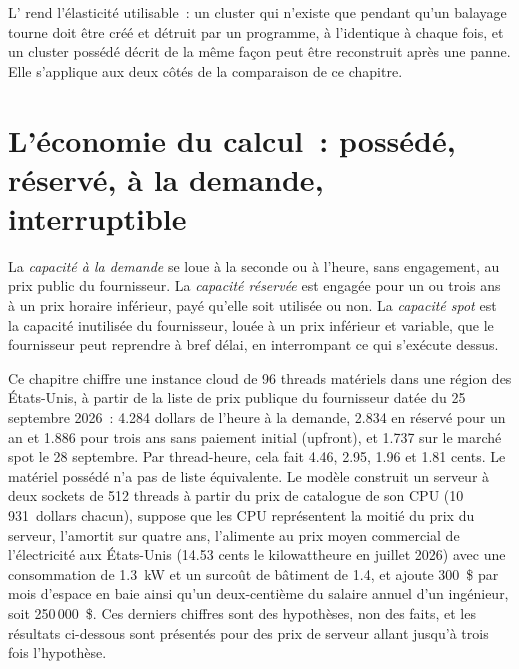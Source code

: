 L' rend l'élasticité utilisable~: un cluster qui n'existe que pendant qu'un balayage tourne doit être créé et détruit par un
programme, à l'identique à chaque fois, et un cluster possédé décrit de la même façon peut être reconstruit après une panne. Elle s'applique aux deux côtés de
la comparaison de ce chapitre.

\section{L'économie du calcul~: possédé, réservé, à la demande, interruptible}

\begin{definition}\label{def:pl:cloud-against-on-premises:capacity}
La \emph{capacité à la demande} se loue à la seconde ou à l'heure, sans engagement, au prix public du fournisseur.
La \emph{capacité réservée} est engagée pour un ou trois ans à un prix horaire inférieur, payé qu'elle soit utilisée ou non.
La \emph{capacité spot} est la capacité inutilisée du fournisseur, louée à un prix inférieur et variable, que le fournisseur
peut reprendre à bref délai, en interrompant ce qui s'exécute dessus.
\end{definition}

Ce chapitre chiffre une instance cloud de 96 threads matériels dans une région des États-Unis, à partir de la liste de prix publique du fournisseur datée du 25 septembre 2026~: 4.284
dollars de l'heure à la demande, 2.834 en réservé pour un an et 1.886 pour trois ans sans paiement initial (upfront), et 1.737 sur le marché spot le 28
septembre. Par thread-heure, cela fait 4.46, 2.95, 1.96 et 1.81 cents. Le matériel possédé n'a pas de liste équivalente. Le modèle construit un serveur à deux sockets de
512 threads à partir du prix de catalogue de son CPU (10\,931~dollars chacun), suppose que les CPU représentent la moitié du prix du serveur, l'amortit sur quatre ans,
l'alimente au prix moyen commercial de l'électricité aux États-Unis (14.53 cents le kilowattheure en juillet 2026) avec une consommation de 1.3~kW et un surcoût de bâtiment
de 1.4, et ajoute 300~\$ par mois d'espace en baie ainsi qu'un deux-centième du salaire annuel d'un ingénieur, soit 250\,000~\$. Ces derniers chiffres sont
des hypothèses, non des faits, et les résultats ci-dessous sont présentés pour des prix de serveur allant jusqu'à trois fois l'hypothèse.

